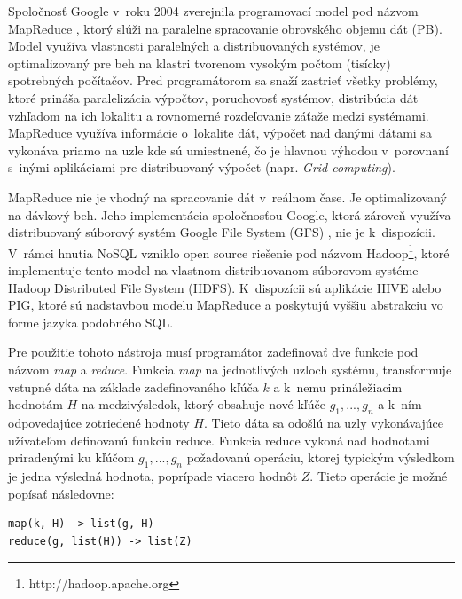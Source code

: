 \documentclass[11pt,twoside,a4paper]{book}
\begin{document}
Spoločnosť Google v~roku 2004 zverejnila programovací model pod názvom MapReduce \cite{dean2008mapreduce}, ktorý slúži na paralelne spracovanie obrovského objemu dát (PB). Model využíva vlastnosti paralelných a distribuovaných systémov, je optimalizovaný pre beh na klastri tvorenom vysokým počtom (tisícky) spotrebných počítačov. Pred programátorom sa snaží zastrieť všetky problémy, ktoré prináša paralelizácia výpočtov, poruchovosť systémov, distribúcia dát vzhľadom na ich lokalitu a rovnomerné rozdeľovanie záťaže medzi systémami. MapReduce využíva informácie o~lokalite dát, výpočet nad danými dátami sa vykonáva priamo na uzle kde sú umiestnené, čo je hlavnou výhodou v~porovnaní s~inými aplikáciami pre distribuovaný výpočet (napr. \emph{Grid computing}). 

MapReduce nie je vhodný na spracovanie dát v~reálnom čase. Je optimalizovaný na dávkový beh. Jeho implementácia spoločnosťou Google, ktorá zároveň využíva distribuovaný súborový systém Google File System (GFS) \cite{ghemawat2003google}, nie je k~dispozícii. V~rámci hnutia NoSQL vzniklo open source riešenie pod názvom Hadoop\footnote{http://hadoop.apache.org}, ktoré implementuje tento model na vlastnom distribuovanom súborovom systéme Hadoop Distributed File System (HDFS). K~dispozícii sú aplikácie HIVE alebo PIG, ktoré sú nadstavbou modelu MapReduce a poskytujú vyššiu abstrakciu vo forme jazyka podobného SQL.


Pre použitie tohoto nástroja musí programátor zadefinovať dve funkcie pod názvom \emph{map} a \emph{reduce}. Funkcia \emph{map} na jednotlivých uzloch systému, transformuje vstupné dáta na základe zadefinovaného kľúča $k$ a k~nemu prináležiacim hodnotám $H$ na medzivýsledok, ktorý obsahuje nové kľúče $g_1,...,g_n$ a k~ním odpovedajúce zotriedené hodnoty $H$. Tieto dáta sa odošlú na uzly vykonávajúce užívateľom definovanú funkciu reduce. Funkcia reduce vykoná nad hodnotami priradenými ku kľúčom $g_1,...,g_n$ požadovanú operáciu, ktorej typickým výsledkom je jedna výsledná hodnota, poprípade viacero hodnôt $Z$. Tieto operácie je možné popísať následovne:

\begin{verbatim}
map(k, H) -> list(g, H)
reduce(g, list(H)) -> list(Z)
\end{verbatim}
\end{document}
